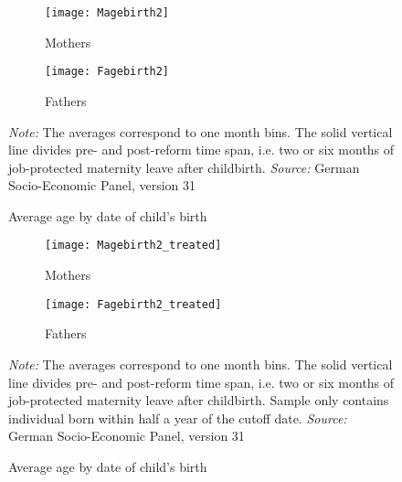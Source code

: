 \documentclass[a4paper ]{article}
\begin{document}
\clearpage

\vspace*{\fill}
\begin{figure}[h]
	\centering
	\begin{subfigure}[h]{0.48\textwidth}
		\centering
		\texttt{[image: Magebirth2]}
		\caption{Mothers}		
	\end{subfigure}
	\quad
	\begin{subfigure}[h]{0.48\textwidth}
		\centering
		\texttt{[image: Fagebirth2]}
		\caption{Fathers}
	\end{subfigure}
	\caption{Average age by date of child's birth}\label{fig:age_birth_all cohorts}
	\begin{minipage}{\textwidth} %
{\footnotesize \textit{Note:} The averages correspond to one month bins. The solid vertical line divides pre- and post-reform time span, i.e. two or six months of job-protected maternity leave after childbirth. \newline \textit{Source: }German Socio-Economic Panel, version 31\par}
\end{minipage}
\end{figure}

\begin{figure}[h]
	\centering
	\begin{subfigure}[h]{0.48\textwidth}
		\centering
		\texttt{[image: Magebirth2\_treated]}
		\caption{Mothers}		
	\end{subfigure}
	\quad
	\begin{subfigure}[h]{0.48\textwidth}
		\centering
		\texttt{[image: Fagebirth2\_treated]}
		\caption{Fathers}
	\end{subfigure}
	\caption{Average age by date of child's birth}\label{fig:age_birth_treatment cohort}
	\begin{minipage}{\textwidth} %
{\footnotesize \textit{Note:} The averages correspond to one month bins. The solid vertical line divides pre- and post-reform time span, i.e. two or six months of job-protected maternity leave after childbirth. Sample only contains individual born within half a year of the cutoff date. \newline \textit{Source: }German Socio-Economic Panel, version 31\par}
\end{minipage}
\end{figure}
\vspace*{\fill}
\end{document}
